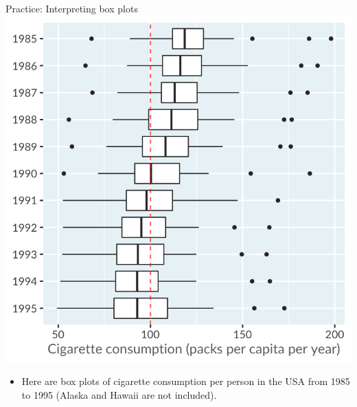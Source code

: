 \documentclass[
  ignorenonframetext,
]{beamer}
\providecommand{\tightlist}{%
  \setlength{\itemsep}{0pt}\setlength{\parskip}{0pt}}
\begin{document}
\begin{frame}{Practice: Interpreting box plots}
\label{practice-interpreting-box-plots}
\includegraphics{../images/im29.png}

\begin{itemize}
\tightlist
\item
  Here are box plots of cigarette consumption per person in the USA from
  1985 to 1995 (Alaska and Hawaii are not included).
\end{itemize}
\end{frame}
\end{document}
